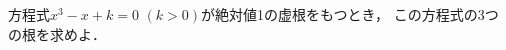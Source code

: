 \documentclass[../../main.tex]{subfiles}
\begin{document}
方程式$x^3-x+k=0$ $(k>0)$が絶対値1の虚根をもつとき，
この方程式の3つの根を求めよ．
\end{document}
